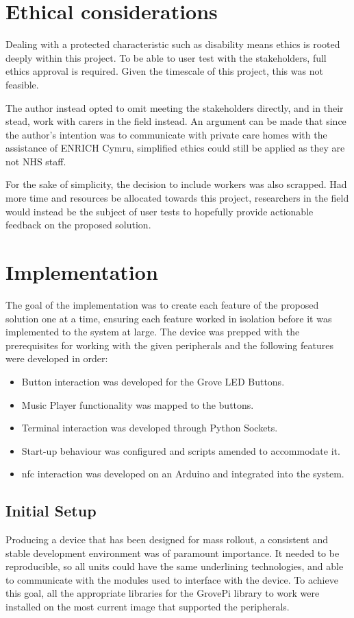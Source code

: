 \section{Ethical considerations}\label{sec:ethics}
Dealing with a protected characteristic such as disability means ethics is rooted deeply within this project. To be able to user test with the stakeholders, full ethics approval is required. Given the timescale of this project, this was not feasible. 

The author instead opted to omit meeting the stakeholders directly, and in their stead, work with carers in the field instead. An argument can be made that since the author's intention was to communicate with private care homes with the assistance of ENRICH Cymru, simplified ethics could still be applied as they are not NHS staff.

For the sake of simplicity, the decision to include workers was also scrapped. Had more time and resources be allocated towards this project, researchers in the field would instead be the subject of user tests to hopefully provide actionable feedback on the proposed solution.

\section{Implementation}\label{sec:impl}
The goal of the implementation was to create each feature of the proposed solution one at a time, ensuring each feature worked in isolation before it was implemented to the system at large. The device was prepped with the prerequisites for working with the given peripherals and the following features were developed in order:
\begin{itemize}
    \item Button interaction was developed for the Grove LED Buttons.
    \item Music Player functionality was mapped to the buttons.
    \item Terminal interaction was developed through Python Sockets.
    \item Start-up behaviour was configured and scripts amended to accommodate it.
    \item \gls{nfc} interaction was developed on an Arduino and integrated into the system.
\end{itemize} 

\subsection{Initial Setup}\label{subsec:setup}
Producing a device that has been designed for mass rollout, a consistent and stable development environment was of paramount importance. It needed to be reproducible, so all units could have the same underlining technologies, and able to communicate with the modules used to interface with the device. To achieve this goal, all the appropriate libraries for the GrovePi library to work were installed on the most current image that supported the peripherals.

